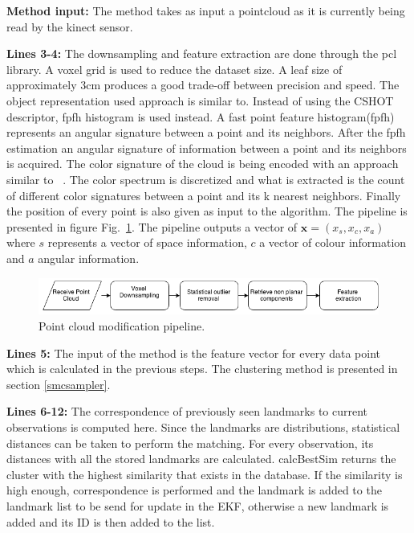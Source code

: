 \documentclass[twoside,hidelinks]{article}
\begin{document}
\textbf{Method input:} The method takes as input a pointcloud as it is currently being read by the kinect sensor.

\textbf{Lines 3-4:} The downsampling and feature extraction are done through the pcl\cite{pcl} library. A voxel grid is used to reduce the dataset size. A leaf size of approximately 3cm produces a good trade-off between precision and speed. The object representation used approach is similar to\cite{objectpointSLAM}. Instead of using the CSHOT descriptor, fpfh\cite{fpfh} histogram is used instead. A fast point feature histogram(fpfh) represents an angular signature between a point and its neighbors. After the fpfh estimation an angular signature of information between a point and its neighbors is acquired. The color signature of the cloud is being encoded with an approach similar to ~\cite{smcddp}. The color spectrum is discretized and what is extracted is the count of different color signatures between a point and its k nearest neighbors. Finally the position of every point is also given as input to the algorithm. The pipeline is presented in figure Fig.~\ref{pcl:mod}. The pipeline outputs a vector of $ \textbf{x} = (x_s, x_c, x_a) $  where $s$ represents a vector of space information, $c$ a vector of colour information and $a$ angular information. 

\begin{figure}[ht!]
  \centering
    \includegraphics[width=1\textwidth]{Basic}
  \caption{Point cloud modification pipeline.}
  \label{pcl:mod}
\end{figure}

\textbf{Lines 5:} The input of the method is the feature vector for every data point which is calculated in the previous steps. The clustering method is presented in section \ref{smcsampler}. 

\textbf{Lines 6-12:} The correspondence of previously seen landmarks to current observations is computed here. Since the landmarks are distributions, statistical distances can be taken to perform the matching. For every observation, its distances with all the stored landmarks are calculated. calcBestSim returns the cluster with the highest similarity that exists in the database. If the similarity is high enough, correspondence is performed and the landmark is added to the landmark list to be send for update in the EKF, otherwise a new landmark is added and its ID is then added to the list.
\end{document}
